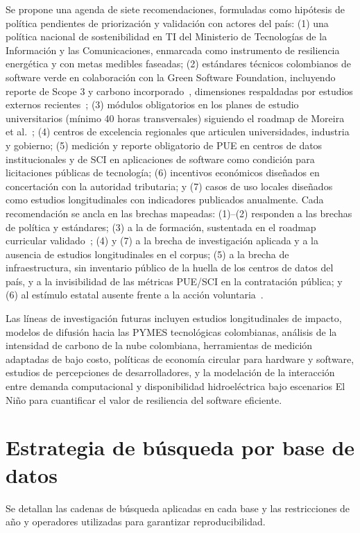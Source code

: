 \documentclass[conference]{IEEEtran}
\begin{document}
Se propone una agenda de siete recomendaciones, formuladas como hip\'otesis de pol\'itica pendientes de priorizaci\'on y validaci\'on con actores del pa\'is: (1) una pol\'itica nacional de sostenibilidad en TI del Ministerio de Tecnolog\'ias de la Informaci\'on y las Comunicaciones, enmarcada como instrumento de resiliencia energ\'etica y con metas medibles faseadas; (2) est\'andares t\'ecnicos colombianos de software verde en colaboraci\'on con la Green Software Foundation, incluyendo reporte de Scope 3 y carbono incorporado~\cite{lin2023}, dimensiones respaldadas por estudios externos recientes~\cite{eilam2024}; (3) m\'odulos obligatorios en los planes de estudio universitarios (m\'inimo 40 horas transversales) siguiendo el roadmap de Moreira et al.~\cite{moreira2024}; (4) centros de excelencia regionales que articulen universidades, industria y gobierno; (5) medici\'on y reporte obligatorio de PUE en centros de datos institucionales y de SCI en aplicaciones de software como condici\'on para licitaciones p\'ublicas de tecnolog\'ia; (6) incentivos econ\'omicos diseñados en concertaci\'on con la autoridad tributaria; y (7) casos de uso locales diseñados como estudios longitudinales con indicadores publicados anualmente. Cada recomendaci\'on se ancla en las brechas mapeadas: (1)--(2) responden a las brechas de pol\'itica y est\'andares; (3) a la de formaci\'on, sustentada en el roadmap curricular validado~\cite{moreira2024}; (4) y (7) a la brecha de investigaci\'on aplicada y a la ausencia de estudios longitudinales en el corpus; (5) a la brecha de infraestructura, sin inventario p\'ublico de la huella de los centros de datos del pa\'is, y a la invisibilidad de las m\'etricas PUE/SCI en la contrataci\'on p\'ublica; y (6) al est\'imulo estatal ausente frente a la acci\'on voluntaria~\cite{maji2025}.

Las l\'ineas de investigaci\'on futuras incluyen estudios longitudinales de impacto, modelos de difusi\'on hacia las PYMES tecnol\'ogicas colombianas, an\'alisis de la intensidad de carbono de la nube colombiana, herramientas de medici\'on adaptadas de bajo costo, pol\'iticas de econom\'ia circular para hardware y software, estudios de percepciones de desarrolladores, y la modelaci\'on de la interacci\'on entre demanda computacional y disponibilidad hidroel\'ectrica bajo escenarios El Niño para cuantificar el valor de resiliencia del software eficiente.




\clearpage
\appendices
\section{Estrategia de b\'usqueda por base de datos}\label{app:busqueda}
Se detallan las cadenas de b\'usqueda aplicadas en cada base y las restricciones de año y operadores utilizadas para garantizar reproducibilidad.
\end{document}
